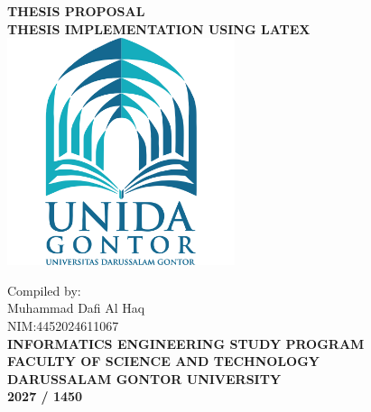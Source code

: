 \begin{titlepage}
	\centering
	{\bfseries THESIS PROPOSAL}\\
	{\bfseries THESIS IMPLEMENTATION USING LATEX}\\ %
	
	\vspace{2cm}
	\includegraphics[width=0.5\textwidth]{assets/logo.png}
	
	\vspace*{2cm}
	{Compiled by:}\\
	{Muhammad Dafi Al Haq}\\  
	{NIM:4452024611067 }\\
	
	\vspace*{4cm}
	{\bfseries INFORMATICS ENGINEERING STUDY PROGRAM\\} 
	{\bfseries FACULTY OF SCIENCE AND TECHNOLOGY\\}
	{\bfseries DARUSSALAM GONTOR UNIVERSITY\\} 
	{\bfseries 2027 / 1450\\}
\end{titlepage}

